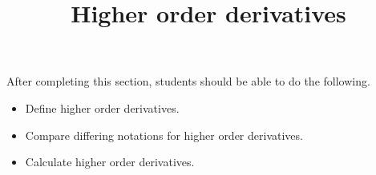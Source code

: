 \documentclass{ximera}
\title{Higher order derivatives}
\begin{document}
\begin{abstract}
\end{abstract}

\maketitle

\begin{sectionOutcomes}

After completing this section, students should be able to do the following.


\begin{itemize}
\item Define higher order derivatives.
\item Compare differing notations for higher order derivatives.
\item Calculate higher order derivatives.

\end{itemize}
\end{sectionOutcomes}
\end{document}
